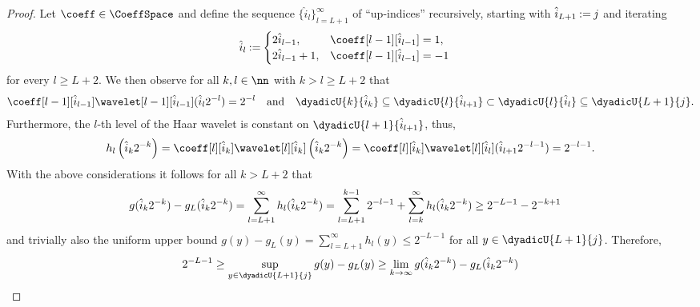 \documentclass[twoside,11pt]{article}
\newcommand{\defeq}{\mathbin{:=}}
\newcommand{\set}[1]{\ensuremath{\mathcal{#1}}}
\begin{document}
\begin{proof}%
    \NewDocumentCommand{\Up}{m}{\hat{\set{U}}_{#1}}
    Let $\coeff\in\CoeffSpace$ and define the sequence $\{\hat{i}_l\}_{l=L+1}^\infty$ of ``up-indices'' recursively, starting with
    $\ip{L+1}\defeq j$ and iterating
    \begin{align}
        \ip{l}&\defeq 
        \begin{cases}
            2\ip{l-1},&\coeff[l-1][\ip{l-1}]=1,\\
            2\ip{l-1}+1,&\coeff[l-1][\ip{l-1}]=-1
        \end{cases}
    \end{align}
    for every $l\geq L+2$.
    We then observe for all $k,l\in\nn$ with $k>l\geq L+2$ that
    \begin{align}
        \coeff[l-1][\ip{l-1}]\wavelet[l-1][\ip{l-1}](\ip{l}2^{-l})=2^{-l}
        \quad\text{and}\quad
        \dyadicU{k}{\ip{k}}\subseteq\dyadicU{l}{\ip{l+1}}\subset\dyadicU{l}{\ip{l}}\subseteq\dyadicU{L+1}{j}.
    \end{align} 
    Furthermore, the $l$-th level of the Haar wavelet is constant on $\dyadicU{l+1}{\ip{l+1}}$,
    thus,
    \begin{align}
        h_l\left(\ip{k}2^{-k}\right)
        =
        \coeff[l][\ip{k}]\wavelet[l][\ip{k}]\left(\ip{k}2^{-k}\right)
        =
        \coeff[l][\ip{k}]\wavelet[l][\ip{l}](\ip{l+1}2^{-l-1})=2^{-l-1}.
    \end{align}
    With the above considerations it follows for all $k>L+2$ that
    \begin{align}
        g(\hat{i}_{k}2^{-k})-g_{L}(\hat{i}_{k}2^{-k})
        &=
        \sum_{l=L+1}^\infty h_l(\hat{i}_{k}2^{-k})
        =
        \sum_{l=L+1}^{k-1} 2^{-l-1}
        +
        \sum_{l=k}^\infty h_l(\hat{i}_{k}2^{-k})
        \geq
        2^{-L-1}-2^{-k+1}
    \end{align}
    and trivially also the uniform upper bound $g(y)-g_{L}(y)=\sum_{l=L+1}^\infty h_l(y)\leq 2^{-L-1}$ for all $y\in\dyadicU{L+1}{j}$.
    Therefore,
    \begin{align}
        2^{-L-1}
        \geq 
        \sup_{y\in\dyadicU{L+1}{j}}g(y)-g_{L}(y)
        \geq
        \lim_{k\to\infty}g(\ip{k}2^{-k})-g_{L}(\ip{k}2^{-k})

\end{align}
\end{proof}
\end{document}
